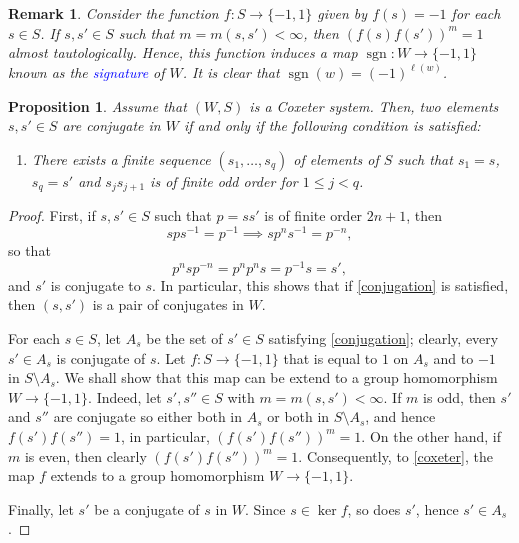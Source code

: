 \documentclass{article}
\theoremstyle{thmstyle}
\newtheorem{proposition}[theorem]{Proposition}
\theoremstyle{defstyle}
\newtheorem{remark}[theorem]{Remark}
\newcommand{\sgn}{\operatorname{sgn}}
\newcommand{\define}[1]{\textcolor{blue}{\textit{#1}}}
\renewcommand{\le}{\leqslant}
\begin{document}
\begin{remark}
    Consider the function $f: S\to\{-1, 1\}$ given by $f(s) = -1$ for each $s\in S$. If $s, s'\in S$ such that $m = m(s, s') < \infty$, then $\left(f(s)f(s')\right)^m = 1$ almost tautologically. Hence, this function induces a map $\sgn: W\to \{-1, 1\}$ known as the \define{signature} of $W$. It is clear that $\sgn(w) = (-1)^{\ell(w)}$.
\end{remark}

\begin{proposition}
    Assume that $(W, S)$ is a Coxeter system. Then, two elements $s, s'\in S$ are conjugate in $W$ if and only if the following condition is satisfied:
    \begin{enumerate}[label=(Con)]
        \item There exists a finite sequence $(s_1,\dots,s_q)$ of elements of $S$ such that $s_1 = s$, $s_q = s'$ and $s_js_{j + 1}$ is of \emph{finite} odd order for $1\le j < q$. \label{conjugation}
    \end{enumerate}
\end{proposition}
\begin{proof}
    First, if $s, s'\in S$ such that $p = ss'$ is of finite order $2n + 1$, then 
    \begin{equation*}
        sps^{-1} = p^{-1}\implies sp^ns^{-1} = p^{-n},
    \end{equation*}
    so that 
    \begin{equation*}
        p^{n}sp^{-n} = p^np^ns = p^{-1}s = s',
    \end{equation*}
    and $s'$ is conjugate to $s$. In particular, this shows that if \ref{conjugation} is satisfied, then $(s, s')$ is a pair of conjugates in $W$.

    For each $s\in S$, let $A_s$ be the set of $s'\in S$ satisfying \ref{conjugation}; clearly, every $s'\in A_s$ is conjugate of $s$. Let $f: S\to\{-1, 1\}$ that is equal to $1$ on $A_s$ and to $-1$ in $S\setminus A_s$. We shall show that this map can be extend to a group homomorphism $W\to \{-1, 1\}$. Indeed, let $s', s''\in S$ with $m = m(s, s') < \infty$. If $m$ is odd, then $s'$ and $s''$ are conjugate so either both in $A_s$ or both in $S\setminus A_s$, and hence $f(s')f(s'') = 1$, in particular, $\left(f(s')f(s'')\right)^m = 1$. On the other hand, if $m$ is even, then clearly $\left(f(s')f(s'')\right)^m = 1$. Consequently, to \ref{coxeter}, the map $f$ extends to a group homomorphism $W\to\{-1, 1\}$.

    Finally, let $s'$ be a conjugate of $s$ in $W$. Since $s\in\ker f$, so does $s'$, hence $s'\in A_s$.
\end{proof}
\end{document}
